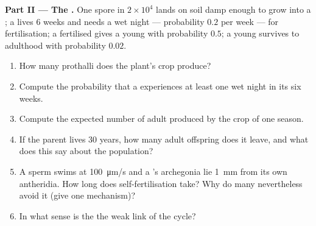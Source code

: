 \begin{problem}
\medskip
\noindent\textbf{Part II --- The .}
One spore in $2\times 10^{4}$ lands on soil damp enough to grow into
a ; a  lives \num{6} weeks and needs a wet
night --- probability $0.2$ per week --- for fertilisation; a
fertilised  gives a young  with probability
$0.5$; a young  survives to adulthood with probability
$0.02$.
\begin{enumerate}[resume]
  \item How many prothalli does the plant's crop produce?
  \item Compute the probability that a  experiences at
        least one wet night in its six weeks.
  \item Compute the expected number of adult  produced by the
        crop of one season.
  \item If the parent lives \num{30} years, how many adult offspring
        does it leave, and what does this say about the 
        population?
  \item A  sperm swims at \qty{100}{\micro m/s} and a 's
        archegonia lie \qty{1}{mm} from its own antheridia. How long
        does self-fertilisation take? Why do many  nevertheless
        avoid it (give one mechanism)?
  \item In what sense is the  the weak link of the 
        cycle?
\end{enumerate}


\end{problem}
